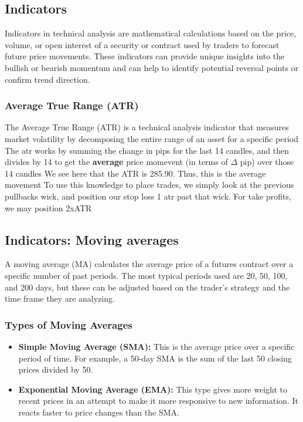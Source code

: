 \documentclass{report}
\begin{document}
    \bigbreak \noindent 
    \subsection{Indicators}
    \bigbreak \noindent 
    Indicators in technical analysis are mathematical calculations based on the price, volume, or open interest of a security or contract used by traders to forecast future price movements. These indicators can provide unique insights into the bullish or bearish momentum and can help to identify potential reversal points or confirm trend direction.
    \bigbreak \noindent 
    \subsubsection{Average True Range (ATR)}
    \bigbreak \noindent 
    The Average True Range (ATR) is a technical analysis indicator that measures market volatility by decomposing the entire range of an asset for a specific period
    \bigbreak \noindent 
    The atr works by summing the change in pips for the last 14 candles, and then divides by 14 to get the \textbf{average} price momevent (in terms of $\Delta$ pip) over those 14 candles
    \bigbreak \noindent 
    \bigbreak \noindent 
    We see here that the ATR is 285.90. Thus, this is the average movement
    \bigbreak \noindent 
    To use this knowledge to place trades, we simply look at the previous pullbacks wick, and position our stop loss 1 atr past that wick. For take profits, we may position 2xATR

    \bigbreak \noindent 
    \subsection{Indicators: Moving averages}
    \bigbreak \noindent 
     A moving average (MA) calculates the average price of a futures contract over a specific number of past periods. The most typical periods used are 20, 50, 100, and 200 days, but these can be adjusted based on the trader's strategy and the time frame they are analyzing.
     \bigbreak \noindent 
     \subsubsection{Types of Moving Averages}
     \bigbreak \noindent 
     \begin{itemize}
         \item \textbf{Simple Moving Average (SMA):} This is the average price over a specific period of time. For example, a 50-day SMA is the sum of the last 50 closing prices divided by 50.
         \item \textbf{Exponential Moving Average (EMA):} This type gives more weight to recent prices in an attempt to make it more responsive to new information. It reacts faster to price changes than the SMA.
     \end{itemize}
     \bigbreak \noindent 
\end{document}
